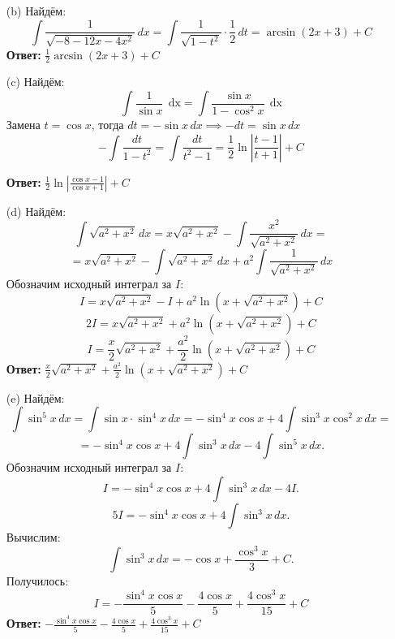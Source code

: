 \documentclass[a4paper]{article}
\renewcommand{\f}[2]{\frac{#1}{#2}}
\newcommand{\dx}{\;\text{dx}}
\begin{document}
\begin{enumerate}
\begin{enumerate}
        \item[(b)]Найдём:
        $$\int \frac{1}{\sqrt{-8 - 12x - 4x^2}} \, dx = \int \frac{1}{\sqrt{1 - t^2}} \cdot \f{1}{2} \, dt
         = \arcsin(2x+3) + C$$
         \textbf{Ответ: } $\f{1}{2} \arcsin(2x+3) + C$

        \item[(c)]Найдём:
        $$\int \frac{1}{\sin x} \, \dx = \int \frac{\sin x}{1 - \cos^2 x} \, \dx$$
        Замена \(t = \cos x\), тогда \(dt = -\sin x \, dx \implies -dt = \sin x \, dx\)
        $$-\int \frac{dt}{1 - t^2} =\int \frac{dt}{t^2-1}= \frac{1}{2} \ln \left| \frac{t-1}{t+1} \right| + C$$

        \textbf{Ответ: } $\frac{1}{2} \ln \left| \frac{\cos x-1}{\cos x+1} \right| + C$\\

        \item[(d)]Найдём:
        $$\int \sqrt{a^2 + x^2} \, dx = x \sqrt{a^2 + x^2} - \int \frac{x^2}{\sqrt{a^2 + x^2}} \, dx =$$
        $$=x \sqrt{a^2 + x^2} - \int \sqrt{a^2 + x^2} \, dx + a^2 \int \frac{1}{\sqrt{a^2 + x^2}} \, dx$$
        Обозначим исходный интеграл за \(I\): 
        \[
        I = x \sqrt{a^2 + x^2} - I + a^2 \ln \left(x + \sqrt{a^2 + x^2}\right) + C
        \]  
        \[
        2I = x \sqrt{a^2 + x^2} + a^2 \ln \left(x + \sqrt{a^2 + x^2}\right) + C
        \]
        \[
        I = \frac{x}{2} \sqrt{a^2 + x^2} + \frac{a^2}{2} \ln \left(x + \sqrt{a^2 + x^2}\right) + C
        \]  
        \textbf{Ответ: } $\frac{x}{2} \sqrt{a^2 + x^2} + \frac{a^2}{2} \ln \left(x + \sqrt{a^2 + x^2}\right) + C$\\

        \item[(e)]Найдём:
        \[
        \int \sin^5 x \, dx = \int \sin x \cdot \sin^4 x \, dx = -\sin^4 x \cos x + 4 \int \sin^3 x \cos^2 x \, dx=
        \]
        \[
        =-\sin^4 x \cos x+4 \int \sin^3 x \, dx - 4 \int \sin^5 x \, dx.
        \]
        Обозначим исходный интеграл за \(I\):
        \[
        I = -\sin^4 x \cos x + 4 \int \sin^3 x \, dx - 4I.
        \]
        \[
        5I = -\sin^4 x \cos x + 4 \int \sin^3 x \, dx.
        \]
        Вычислим:
        \[
        \int \sin^3 x \, dx = -\cos x + \frac{\cos^3 x}{3} + C.
        \]
        Получилось:
        \[
        I = -\frac{\sin^4 x \cos x}{5} - \frac{4\cos x}{5} + \frac{4\cos^3 x}{15} + C
        \]
        \textbf{Ответ: } $-\frac{\sin^4 x \cos x}{5} - \frac{4\cos x}{5} + \frac{4\cos^3 x}{15} + C$\\



\end{enumerate}
\end{enumerate}
\end{document}
